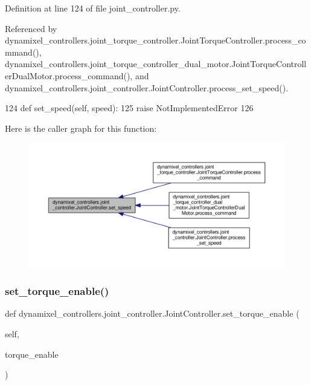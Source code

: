Definition at line 124 of file joint\+\_\+controller.\+py.



Referenced by dynamixel\+\_\+controllers.\+joint\+\_\+torque\+\_\+controller.\+Joint\+Torque\+Controller.\+process\+\_\+command(), dynamixel\+\_\+controllers.\+joint\+\_\+torque\+\_\+controller\+\_\+dual\+\_\+motor.\+Joint\+Torque\+Controller\+Dual\+Motor.\+process\+\_\+command(), and dynamixel\+\_\+controllers.\+joint\+\_\+controller.\+Joint\+Controller.\+process\+\_\+set\+\_\+speed().


\begin{DoxyCode}
124     \textcolor{keyword}{def }set\_speed(self, speed):
125         \textcolor{keywordflow}{raise} NotImplementedError
126 
\end{DoxyCode}
Here is the caller graph for this function\+:
\nopagebreak
\begin{figure}[H]
\begin{center}
\leavevmode
\includegraphics[width=350pt]{d3/dcd/classdynamixel__controllers_1_1joint__controller_1_1_joint_controller_ae33e128897d20f659427e69e7f791a88_icgraph}
\end{center}
\end{figure}
\mbox{\label{classdynamixel__controllers_1_1joint__controller_1_1_joint_controller_ad65f926abe6c4dec19d0a4dbd05d21d9}} 
\subsubsection{\texorpdfstring{set\+\_\+torque\+\_\+enable()}{set\_torque\_enable()}}
{\footnotesize\ttfamily def dynamixel\+\_\+controllers.\+joint\+\_\+controller.\+Joint\+Controller.\+set\+\_\+torque\+\_\+enable (\begin{DoxyParamCaption}\item[{}]{self,  }\item[{}]{torque\+\_\+enable }\end{DoxyParamCaption})}



